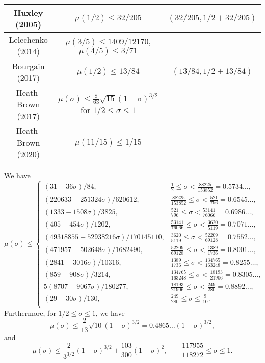 \begin{table}[ht]
\begin{tabular}{|c|c|c|}
\hline
Huxley (2005) \cite{huxley_exponential_2005} & $\mu(1/2) \leq 32/205$ & $(32/205, 1/2+32/205)$ \\
\hline
Lelechenko (2014) \cite{Lelechenko_linear_2014} & $\mu(3/5) \leq 1409/12170$, $\mu(4/5) \leq 3/71$& \\
\hline
Bourgain (2017) \cite{bourgain_decoupling_2017} & $\mu(1/2) \leq 13/84$ & $(13/84, 1/2+13/84)$ \\
\hline
Heath-Brown (2017) \cite{heathbrown_new_2017} & $\mu(\sigma) \le \frac{8}{63}\sqrt{15}(1 - \sigma)^{3/2}$ for $1/2 \le \sigma \le 1$& \\
\hline
Heath-Brown (2020) \cite{demeter_small_2020} & $\mu(11/15) \leq 1/15$& \\
\hline
\end{tabular}
\end{table}\label{mu-table}

\literature
{}


\begin{theorem}\label{mu_est_thm}\cite[Theorems 2.4-2.6]{trudgian-yang}
    We have
    \[
    \mu(\sigma) \le \begin{cases}
         (31 - 36\sigma)/84 , & \frac{1}{2} \leq\sigma < \frac{88225}{153852} = 0.5734\ldots, \\
         (220633 - 251324\sigma)/620612 , & \frac{88225}{153852} \leq\sigma < \frac{521}{796} = 0.6545\ldots, \\
         (1333 - 1508\sigma)/3825 , & \frac{521}{796} \leq\sigma < \frac{53141}{76066} = 0.6986\ldots, \\
         (405 - 454\sigma)/1202 , & \frac{53141}{76066} \leq\sigma < \frac{3620}{5119} = 0.7071\ldots, \\
         (49318855 - 52938216\sigma)/170145110 , & \frac{3620}{5119} \leq\sigma < \frac{52209}{69128} = 0.7552\ldots, \\
         (471957 - 502648\sigma)/1682490 , & \frac{52209}{69128} \leq\sigma < \frac{1389}{1736} = 0.8001\ldots, \\
         (2841 - 3016\sigma)/10316 , & \frac{1389}{1736} \leq\sigma < \frac{134765}{163248} = 0.8255\ldots, \\
         (859 - 908\sigma)/3214 , & \frac{134765}{163248} \leq\sigma < \frac{18193}{21906} = 0.8305\ldots, \\
         5(8707 - 9067\sigma)/180277 , & \frac{18193}{21906} \leq\sigma < \frac{249}{280} = 0.8892\ldots, \\
         (29 - 30\sigma)/130 , & \frac{249}{280} \leq\sigma \leq \frac{9}{10}.\\
    \end{cases}
    \]
    Furthermore, for $1/2 \le \sigma \le 1$, we have
\[
\mu(\sigma) \le \frac{2}{13}\sqrt{10}(1 - \sigma)^{3/2} = 0.4865\ldots(1 - \sigma)^{3/2},
\]
and
\[
\mu(\sigma) \le \frac{2}{3^{3/2}}(1 - \sigma)^{3/2} + \frac{103}{300}(1 - \sigma)^{2},\qquad \frac{117955}{118272} \le \sigma \le 1.
\]
\end{theorem}

